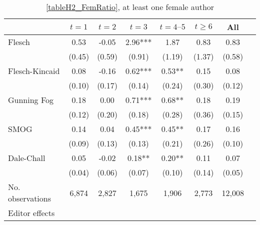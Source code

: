 \begin{table}
    \footnotesize
    \centering
    \begin{threeparttable}
        \caption{\autoref{tableH2_FemRatio}, at least one female author}
        \label{tableH2_Fem1}
        \begin{tabular}{p{3cm}S@{}S@{}S@{}S@{}S@{}S@{}S@{}}
            \toprule
            &{\(t=1\)}&{\(t=2\)}&{\(t=3\)}&{\(t=4\text{--}5\)}&{\(t\ge6\)}&{All}\\
            \midrule
            Flesch                        &        0.53   &       -0.05   &        2.96***&        1.87   &        0.83   &        0.83   \\
                                          &      (0.45)   &      (0.59)   &      (0.91)   &      (1.19)   &      (1.37)   &      (0.58)   \\
            Flesch-Kincaid                &        0.08   &       -0.16   &        0.62***&        0.53** &        0.15   &        0.08   \\
                                          &      (0.10)   &      (0.17)   &      (0.14)   &      (0.24)   &      (0.30)   &      (0.12)   \\
            Gunning Fog                   &        0.18   &        0.00   &        0.71***&        0.68** &        0.18   &        0.19   \\
                                          &      (0.12)   &      (0.20)   &      (0.18)   &      (0.28)   &      (0.36)   &      (0.15)   \\
            SMOG                          &        0.14   &        0.04   &        0.45***&        0.45** &        0.17   &        0.16   \\
                                          &      (0.09)   &      (0.13)   &      (0.13)   &      (0.21)   &      (0.26)   &      (0.10)   \\
            Dale-Chall                    &        0.05   &       -0.02   &        0.18** &        0.20** &        0.11   &        0.07   \\
                                          &      (0.04)   &      (0.06)   &      (0.07)   &      (0.10)   &      (0.14)   &      (0.05)   \\
            \midrule
            No. observations              &       6,874   &       2,827   &       1,675   &       1,906   &       2,773   &      12,008   \\
            \midrule
            Editor effects       &           {}   &           {}   &           {}   &           {}   &           {}   &           {}   \\

\end{tabular}
\end{threeparttable}
\end{table}
